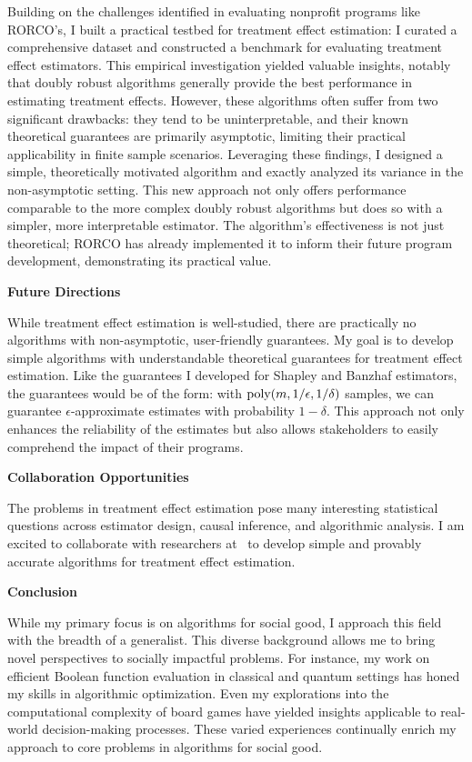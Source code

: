 \documentclass[11pt]{article}
\begin{document}
{Building on the challenges identified in evaluating nonprofit programs like RORCO's, I built a practical testbed for treatment effect estimation: I curated a comprehensive dataset and constructed a benchmark for evaluating treatment effect estimators. This empirical investigation yielded valuable insights, notably that doubly robust algorithms generally provide the best performance in estimating treatment effects. However, these algorithms often suffer from two significant drawbacks: they tend to be uninterpretable, and their known theoretical guarantees are primarily asymptotic, limiting their practical applicability in finite sample scenarios.
Leveraging these findings, I designed a simple, theoretically motivated algorithm and exactly analyzed its variance in the non-asymptotic setting. This new approach not only offers performance comparable to the more complex doubly robust algorithms but does so with a simpler, more interpretable estimator. The algorithm's effectiveness is not just theoretical; RORCO has already implemented it to inform their future program development, demonstrating its practical value.

{ \large \textbf{Future Directions}}

While treatment effect estimation is well-studied, there are practically no algorithms with non-asymptotic, user-friendly guarantees.
My goal is to develop simple algorithms with understandable theoretical guarantees for treatment effect estimation.
Like the guarantees I developed for Shapley and Banzhaf estimators, the guarantees would be of the form: with $\textnormal{poly}(m, 1/\epsilon, 1/\delta)$ samples, we can guarantee $\epsilon$-approximate estimates with probability $1-\delta$.
This approach not only enhances the reliability of the estimates but also allows stakeholders to easily comprehend the impact of their programs.

{ \large \textbf{Collaboration Opportunities}}

The problems in treatment effect estimation pose many interesting statistical questions across estimator design, causal inference, and algorithmic analysis. I am excited to collaborate with researchers at \school~to develop simple and provably accurate algorithms for treatment effect estimation.

\begin{center}
{ \large \textbf{Conclusion}}
\end{center}

While my primary focus is on algorithms for social good, I approach this field with the breadth of a generalist. This diverse background allows me to bring novel perspectives to socially impactful problems. For instance, my work on efficient Boolean function evaluation in classical \cite{hellerstein2022adaptivity} and quantum settings \cite{czekanski2023robust,kimmel2021query,delorenzo2019applications} has honed my skills in algorithmic optimization. Even my explorations into the computational complexity of board games \cite{witter2020applications,witter2021backgammon} have yielded insights applicable to real-world decision-making processes. These varied experiences continually enrich my approach to core problems in algorithms for social good.

}
\end{document}
